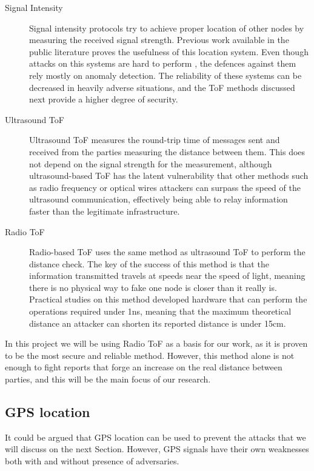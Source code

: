 \documentclass{article}
\begin{document}
\begin{description}
  \item[Signal Intensity] Signal intensity protocols try to achieve proper location of other nodes by measuring the received signal strength. Previous work available in the public literature\cite{seshadri2005bayesian} proves the usefulness of this location system. Even though attacks on this systems are hard to perform \cite{sheng2008detecting}, the defences against them rely mostly on anomaly detection. The reliability of these systems can be decreased in heavily adverse situations, and the ToF methods discussed next provide a higher degree of security.
  \item[Ultrasound ToF] Ultrasound ToF measures the round-trip time of messages sent and received from the parties measuring the distance between them. This does not depend on the signal strength for the measurement, although ultrasound-based ToF has the latent vulnerability that other methods such as radio frequency or optical wires attackers can surpass the speed of the ultrasound communication, effectively being able to relay information faster than the legitimate infrastructure\cite{capkun2006secure}.
  \item[Radio ToF] Radio-based ToF uses the same method as ultrasound ToF to perform the distance check. The key of the success of this method is that the information transmitted travels at speeds near the speed of light, meaning there is no physical way to fake one node is closer than it really is. Practical studies on this method \cite{rasmussen2010realization} developed hardware that can perform the operations required under 1ns, meaning that the maximum theoretical distance an attacker can shorten its reported distance is under 15cm.
\end{description}

In this project we will be using Radio ToF as a basis for our work, as it is proven to be the most secure and reliable method. However, this method alone is not enough to fight reports that forge an increase on the real distance between parties, and this will be the main focus of our research.

\subsection{GPS location}

It could be argued that GPS location can be used to prevent the attacks that we will discuss on the next Section. However, GPS signals have their own weaknesses both with and without presence of adversaries.
\end{document}
